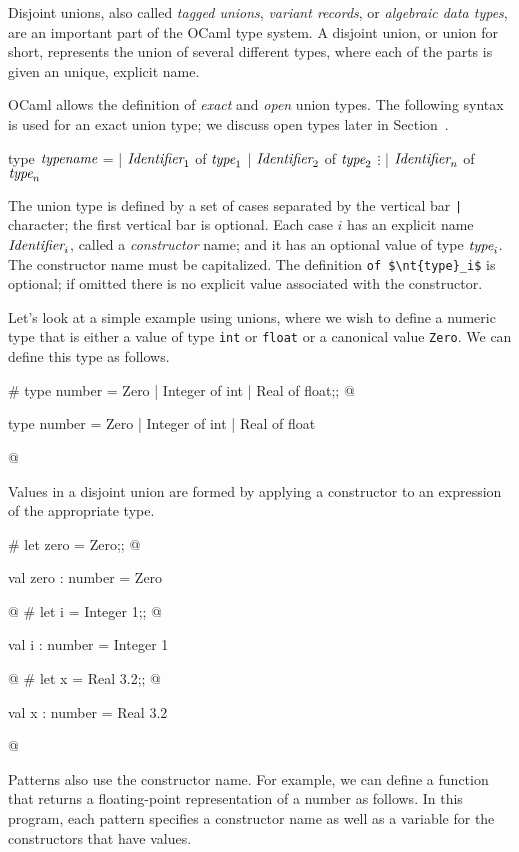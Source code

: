Disjoint unions, also called \emph{tagged unions}, \emph{variant records}, or
\emph{algebraic data types}, are an important part of the OCaml type system.
A disjoint union, or union for short, represents the union of several
different types, where each of the parts is given an unique, explicit
name.

OCaml allows the definition of \emph{exact} and \emph{open} union
types.  The following syntax is used for an exact union type; we
discuss open types later in Section~.

\label{keyword:of}
\label{keyword:type}
\begin{ocaml}
type $\textit{\rmfamily typename}$ =
 | $\textit{\rmfamily Identifier}_1$ of $\textit{\rmfamily type}_1$
 | $\textit{\rmfamily Identifier}_2$ of $\textit{\rmfamily type}_2$
 $\vdots$
 | $\textit{\rmfamily Identifier}_n$ of $\textit{\rmfamily type}_n$
\end{ocaml}
%
The union type is defined by a set of cases separated by the vertical
bar \hbox{\lstinline/|/} character; the first vertical bar is optional.  Each case $i$ has an explicit name
$\emph{Identifier}_i$, called a \emph{constructor} name; and it has an optional
value of type $\emph{type}_i$.  The constructor name must be
capitalized.  The definition \hbox{\lstinline/of $\nt{type}_i$/} is optional; if
omitted there is no explicit value associated with the constructor.

Let's look at a simple example using unions, where we wish to define a
numeric type that is either a value of type \hbox{\lstinline/int/} or \hbox{\lstinline/float/}
or a canonical value \hbox{\lstinline/Zero/}.  We can define this type as follows.

\begin{ocaml}
# type number =
     Zero
   | Integer of int
   | Real of float;;
@
\begin{topoutput}
type number = Zero | Integer of int | Real of float
\end{topoutput}
@
\end{ocaml}
%
Values in a disjoint union are formed by applying a constructor to
an expression of the appropriate type.

\begin{ocaml}
# let zero = Zero;;
@
\begin{topoutput}
val zero : number = Zero
\end{topoutput}
@
# let i = Integer 1;;
@
\begin{topoutput}
val i : number = Integer 1
\end{topoutput}
@
# let x = Real 3.2;;
@
\begin{topoutput}
val x : number = Real 3.2
\end{topoutput}
@
\end{ocaml}
%
\label{constructor-patterns}
Patterns also use the constructor name.  For example, we can define a function
that returns a floating-point representation of a number as follows.  In this program,
each pattern specifies a constructor name as well as a variable for the constructors
that have values.

